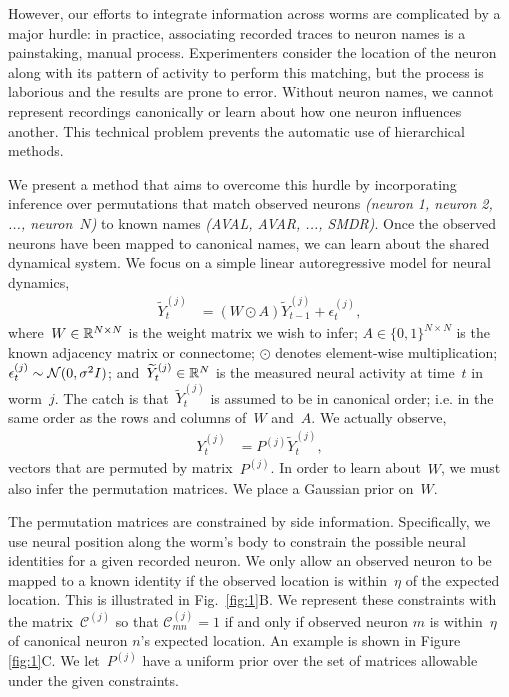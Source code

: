 \documentclass{article}
\begin{document}
However, our efforts to integrate information across worms are
complicated by a major hurdle: in practice, associating recorded
traces to neuron names is a painstaking, manual process.
Experimenters consider the location of the neuron along with its
pattern of activity to perform this matching, but the process is
laborious and the results are prone to error.  Without neuron names,
we cannot represent recordings canonically or learn about how one
neuron influences another. This technical problem prevents the
automatic use of hierarchical methods.

We present a method that aims to overcome this hurdle by incorporating
inference over permutations that match observed neurons
\textit{(neuron 1, neuron 2, ..., neuron~$N$)} to known names
\textit{(AVAL, AVAR, ..., SMDR)}.  Once the observed neurons have been
mapped to canonical names, we can learn about the shared dynamical
system. We focus on a simple linear autoregressive
model for neural dynamics,
\begin{align}
  \widetilde{Y}_t^{(j)} &= (W \odot A) \widetilde{Y}_{t-1}^{(j)} + \epsilon_t^{(j)},
\end{align}
where~$W \in \mathbb{R}^{N \times N}$ is the weight matrix we wish to infer;
$A \in \{0,1\}^{N \times N}$ is the known adjacency matrix or connectome;
$\odot$ denotes element-wise multiplication;
$\epsilon_t^{(j)} \sim \mathcal{N}(0, \sigma^2 I)$;
and~$\widetilde{Y}_t^{(j)} \in \mathbb{R}^N$ is the measured neural activity
at time~$t$ in worm~$j$.  The catch is that~$\widetilde{Y}_t^{(j)}$ is
assumed to be in canonical order; i.e. in the same order as the rows and
columns of~$W$ and~$A$. We actually observe,
\begin{align}
  Y_t^{(j)} &= P^{(j)} \widetilde{Y}_t^{(j)},
\end{align}
vectors that are permuted by matrix~$P^{(j)}$. In order to learn about~$W$,
we must also infer the permutation matrices. We place a Gaussian prior on~$W$.

The permutation matrices are constrained by side
information. Specifically, we use neural position along the worm's
body to constrain the possible neural identities for a given recorded
neuron. We only allow an observed neuron to be mapped to a known
identity if the observed location is within~$\eta$ of the expected
location.  This is illustrated in Fig.~\ref{fig:1}B. We represent
these constraints with the matrix~$\mathcal{C}^{(j)}$ so that
$\mathcal{C}^{(j)}_{mn}=1$ if and only if observed neuron $m$ is
within~$\eta$ of canonical neuron $n$'s expected location.  An
example is shown in Figure \ref{fig:1}C. We let~$P^{(j)}$ have a
uniform prior over the set of matrices allowable under the given
constraints.
\end{document}
